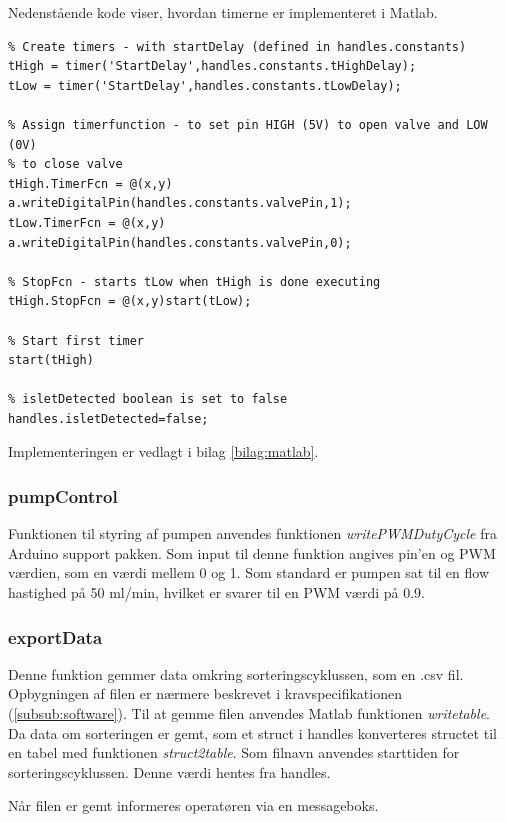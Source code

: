 Nedenstående kode viser, hvordan timerne er implementeret i Matlab.  
\begin{lstlisting} 
% Create timers - with startDelay (defined in handles.constants)
tHigh = timer('StartDelay',handles.constants.tHighDelay);
tLow = timer('StartDelay',handles.constants.tLowDelay);

% Assign timerfunction - to set pin HIGH (5V) to open valve and LOW (0V)
% to close valve
tHigh.TimerFcn = @(x,y) a.writeDigitalPin(handles.constants.valvePin,1);
tLow.TimerFcn = @(x,y) a.writeDigitalPin(handles.constants.valvePin,0);

% StopFcn - starts tLow when tHigh is done executing
tHigh.StopFcn = @(x,y)start(tLow);

% Start first timer
start(tHigh)

% isletDetected boolean is set to false
handles.isletDetected=false;
\end{lstlisting} 

Implementeringen er vedlagt i bilag \ref{bilag:matlab}.

\newpage
\subsubsection{pumpControl}
Funktionen til styring af pumpen anvendes funktionen \textit{writePWMDutyCycle} fra Arduino support pakken. Som input til denne funktion angives pin'en og PWM værdien, som en værdi mellem 0 og 1. Som standard er pumpen sat til en flow hastighed på 50 ml/min, hvilket er svarer til en PWM værdi på 0.9. 


\subsubsection{exportData}
Denne funktion gemmer data omkring sorteringscyklussen, som en .csv fil. Opbygningen af filen er nærmere beskrevet i kravspecifikationen (\ref{subsub:software}). Til at gemme filen anvendes Matlab funktionen \textit{writetable}. Da data om sorteringen er gemt, som et struct i handles konverteres structet til en tabel med funktionen \textit{struct2table}. Som filnavn anvendes starttiden for sorteringscyklussen. Denne værdi hentes fra handles.

Når filen er gemt informeres operatøren via en messageboks. 

